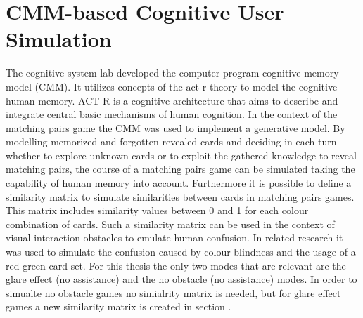 \chapter{CMM-based Cognitive User Simulation}
\label{simulator}
The cognitive system lab developed the computer program cognitive memory model (CMM).
It utilizes concepts of the act-r-theory to model the cognitive human memory. ACT-R is a cognitive architecture that aims to describe and integrate  central basic mechanisms of human cognition.  In the context of the matching pairs game the CMM was used to implement a generative model. By modelling memorized and forgotten revealed cards and deciding in each turn whether to explore unknown cards or to exploit the gathered knowledge to reveal matching pairs, the course of a matching pairs game can be simulated taking the capability of human memory into account. Furthermore it is possible to define a similarity matrix to simulate similarities between cards in matching pairs games. This matrix includes similarity values between 0 and 1 for each colour combination of cards. Such a similarity matrix can be used in the context of visual interaction obstacles to emulate human confusion. In related research it was used to simulate the confusion caused by colour blindness and the usage of a red-green card set. For this thesis the only two modes that are relevant are the glare effect (no assistance) and the no obstacle (no assistance) modes. In order to simualte no obstacle games no simialrity matrix is needed, but for glare effect games a new similarity matrix is created in section .




